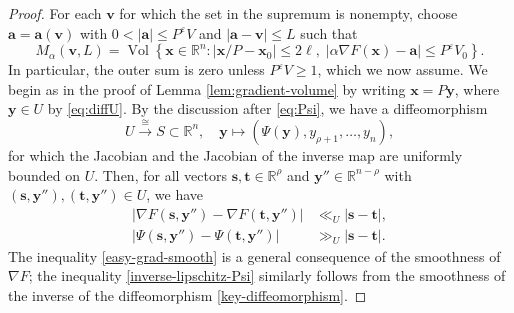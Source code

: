 \documentclass[a4paper,11pt, twoside,reqno]{amsart}
\theoremstyle{plain}
\theoremstyle{definition}
\theoremstyle{remark}
\newcommand{\bfx}{\bm{x}}
\newcommand{\bfy}{\bm{y}}
\newcommand{\RR}{\mathbb{R}}
\DeclareMathOperator{\meas}{Vol}
\newcommand{\ve}{\varepsilon}
\renewcommand{\le}{\leqslant}
\renewcommand{\leq}{\leqslant}
\renewcommand{\ge}{\geqslant}
\numberwithin{equation}{section}
\begin{document}
\begin{proof}
For each $\bm{v}$
for which the set in the supremum is nonempty,
choose $\bm{a}=\bm{a}(\bm{v})$
with $0<|\bm{a}|\leq P^\ve V$
and $|\bm{a}-\bm{v}| \le L$
such that
\begin{equation}
\label{choose-shifted box-max-vector-a}
M_\alpha(\bm{v},L) =
\meas\left\{
\bfx\in\RR^n:
|\bfx/P-\bm{x}_0|\le 2\ell,\;
|\alpha\nabla F(\bm{x})-\bm{a}|\leq P^\varepsilon V_0
\right\}.
\end{equation}
In particular, the outer sum is zero unless $P^\ve V \ge 1$, which we now assume.
We begin as in the proof of Lemma \ref{lem:gradient-volume} by writing $\bm{x}=P\bm{y}$,
where $\bfy\in U$ by \eqref{eq:diffU}.
By the discussion after \eqref{eq:Psi},
we have a diffeomorphism
\begin{equation}
\label{key-diffeomorphism}
U\xrightarrow{\cong} S\subset \RR^n, \quad 
\bm{y} \mapsto \left(\Psi(\bm{y}),y_{\rho+1},\dots,y_n\right),
\end{equation}
for which the Jacobian and the  Jacobian of the inverse map are uniformly bounded on $U$.
Then, for all vectors $\bm{s},\bm{t}\in \RR^\rho$ and $\bm{y}''\in \RR^{n-\rho}$
with $(\bm{s},\bm{y}''),(\bm{t},\bm{y}'')\in U$, we have
\begin{align}
|\nabla F(\bm{s},\bm{y}'') - \nabla F(\bm{t},\bm{y}'')|
&\ll_U |\bm{s}-\bm{t}|,
\label{easy-grad-smooth} \\
|\Psi(\bm{s},\bm{y}'') - \Psi(\bm{t},\bm{y}'')|
&\gg_U |\bm{s}-\bm{t}|.
\label{inverse-lipschitz-Psi}
\end{align}
The inequality \eqref{easy-grad-smooth} is a general consequence of the smoothness of $\nabla F$;
the inequality \eqref{inverse-lipschitz-Psi} similarly follows from the smoothness of the inverse of the diffeomorphism \eqref{key-diffeomorphism}.


\end{proof}
\end{document}
